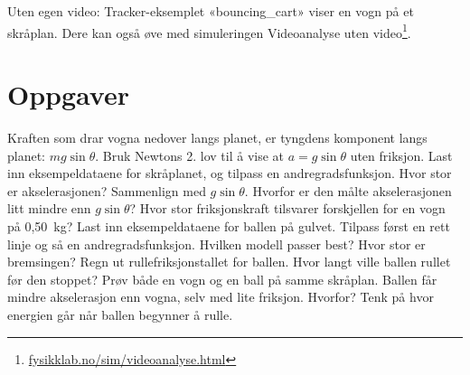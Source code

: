 \documentclass[11pt]{article}
\begin{document}
Uten egen video: Tracker-eksemplet «bouncing\_cart» viser en vogn på et skråplan. Dere kan også øve med simuleringen Videoanalyse uten video\footnote{\url{fysikklab.no/sim/videoanalyse.html}}.

\section*{Oppgaver}

\begin{oppgaveliste}
\oppgave {}Kraften som drar vogna nedover langs planet, er tyngdens komponent langs planet: $mg \sin  θ$. Bruk Newtons 2. lov til å vise at $a = g \sin  θ$ uten friksjon.
\svar
\oppgave {}Last inn eksempeldataene for skråplanet, og tilpass en andregradsfunksjon. Hvor stor er akselerasjonen? Sammenlign med $g \sin  θ$.
\svar
\oppgave {}Hvorfor er den målte akselerasjonen litt mindre enn $g \sin  θ$? Hvor stor friksjonskraft tilsvarer forskjellen for en vogn på 0,50~kg?
\svar
\oppgave {}Last inn eksempeldataene for ballen på gulvet. Tilpass først en rett linje og så en andregradsfunksjon. Hvilken modell passer best? Hvor stor er bremsingen?
\svar
\oppgave {}Regn ut rullefriksjonstallet for ballen. Hvor langt ville ballen rullet før den stoppet?
\svar
\oppgave {}Prøv både en vogn og en ball på samme skråplan. Ballen får mindre akselerasjon enn vogna, selv med lite friksjon. Hvorfor? Tenk på hvor energien går når ballen begynner å rulle.
\svar
\end{oppgaveliste}
\end{document}
